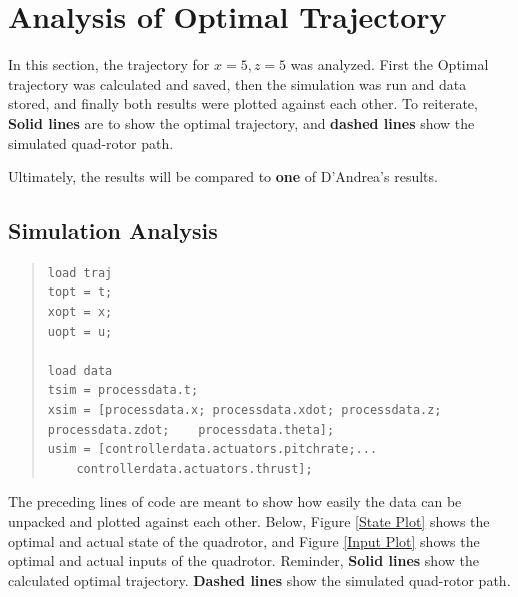 \documentclass[12pt]{article}
\begin{document}
\section{Analysis of Optimal Trajectory}

In this section, the trajectory for $x=5,z=5$ was analyzed. First the Optimal trajectory was calculated and saved, then the simulation was run and data stored, and finally both results were plotted against each other. To reiterate, \textbf{Solid lines} are to show the optimal trajectory, and \textbf{dashed lines} show the simulated quad-rotor path.

Ultimately, the results will be compared to \textbf{one} of D'Andrea's results\cite{D'Andrea}. 

\subsection{Simulation Analysis}
\begin{quote}
\begin{lstlisting}
load traj
topt = t;
xopt = x;
uopt = u;

load data
tsim = processdata.t;
xsim = [processdata.x; processdata.xdot; processdata.z; processdata.zdot;    processdata.theta];
usim = [controllerdata.actuators.pitchrate;...
	controllerdata.actuators.thrust];
\end{lstlisting}
\end{quote}
The preceding lines of code are meant to show how easily the data can be unpacked and plotted against each other. Below, Figure \ref{State Plot} shows the optimal and actual state of the quadrotor, and Figure \ref{Input Plot} shows the optimal and actual inputs of the quadrotor.
\newline
\newline
Reminder, \textbf{Solid lines} show the calculated optimal trajectory. \textbf{Dashed lines} show the simulated quad-rotor path.
\end{document}
